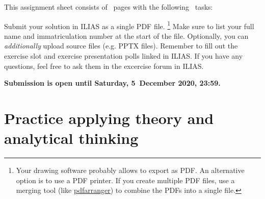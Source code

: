 \documentclass{acAssignment}
\begin{document}
\maketitle

This assignment sheet consists of \acNumPages~pages with the following \acNumTasks~tasks:

\acListOfTasks

Submit your solution in ILIAS as a single PDF file.%
\footnote{Your drawing software probably allows to export as PDF.
    An alternative option is to use a PDF printer.
    If you create multiple PDF files, use a merging tool (like \href{https://github.com/pdfarranger/pdfarranger}{pdfarranger}) to combine the PDFs into a single file.}
Make sure to list your full name and immatriculation number at the start of the file.
Optionally, you can \emph{additionally} upload source files (e.g. PPTX files).
Remember to fill out the exercise slot and exercise presentation polls linked in ILIAS.
If you have any questions, feel free to ask them in the excercise forum in ILIAS.

\textbf{Submission is open until Saturday, 5~December 2020, 23:59.}

\section{Practice applying theory and analytical thinking}
\end{document}
